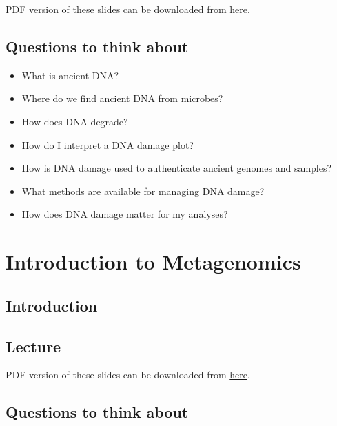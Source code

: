 \documentclass[
  letterpaper,
]{book}
\providecommand{\tightlist}{%
  \setlength{\itemsep}{0pt}\setlength{\parskip}{0pt}}\usepackage{longtable,booktabs,array}
\begin{document}
PDF version of these slides can be downloaded from
\href{https://github.com/SPAAM-community/wss-summer-school/raw/main/docs/assets/slides/2022/2a-intro-to-adna/SPAAM\%20Summer\%20School\%202022\%20-\%202A\%20-\%20Intro\%20to\%20Ancient\%20DNA.pdf}{here}.

\hypertarget{questions-to-think-about-1}{%
\section{Questions to think about}\label{questions-to-think-about-1}}

\begin{itemize}
\tightlist
\item
  What is ancient DNA?
\item
  Where do we find ancient DNA from microbes?
\item
  How does DNA degrade?
\item
  How do I interpret a DNA damage plot?
\item
  How is DNA damage used to authenticate ancient genomes and samples?
\item
  What methods are available for managing DNA damage?
\item
  How does DNA damage matter for my analyses?
\end{itemize}

\hypertarget{introduction-to-metagenomics-1}{%
\chapter{Introduction to
Metagenomics}\label{introduction-to-metagenomics-1}}

\hypertarget{introduction-1}{%
\section{Introduction}\label{introduction-1}}

\hypertarget{lecture-2}{%
\section{Lecture}\label{lecture-2}}

PDF version of these slides can be downloaded from
\href{https://github.com/SPAAM-community/wss-summer-school/raw/main/docs/assets/slides/2022/3a-intro-to-metagenomics/SPAAM\%20Summer\%20School\%202022\%20-\%203A\%20-\%20Intro\%20to\%20Metagenomics.pdf}{here}.

\hypertarget{questions-to-think-about-2}{%
\section{Questions to think about}\label{questions-to-think-about-2}}
\end{document}
